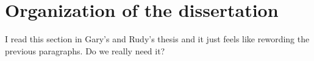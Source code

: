 \section{Organization of the dissertation}

{\color{red} I read this section in Gary's and Rudy's thesis and it just feels like rewording the previous paragraphs. Do we really need it?}



